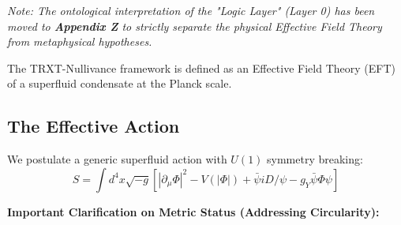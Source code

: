 \documentclass[a4paper,12pt]{article}
\newcommand{\slashed}[1]{\ensuremath{#1\!\!\!/}}
\begin{document}
\textit{Note: The ontological interpretation of the "Logic Layer" (Layer 0) has been moved to \textbf{Appendix Z} to strictly separate the physical Effective Field Theory from metaphysical hypotheses.}

The TRXT-Nullivance framework is defined as an Effective Field Theory (EFT) of a superfluid condensate at the Planck scale.
\subsection{The Effective Action}
We postulate a generic superfluid action with $U(1)$ symmetry breaking:
\begin{equation}
    S = \int d^4x \sqrt{-g} \left[ |\partial_\mu \Phi|^2 - V(|\Phi|) + \bar{\psi} i \slashed{D} \psi - g_Y \bar{\psi} \Phi \psi \right]
\end{equation}

\textbf{Important Clarification on Metric Status (Addressing Circularity):}
\end{document}
